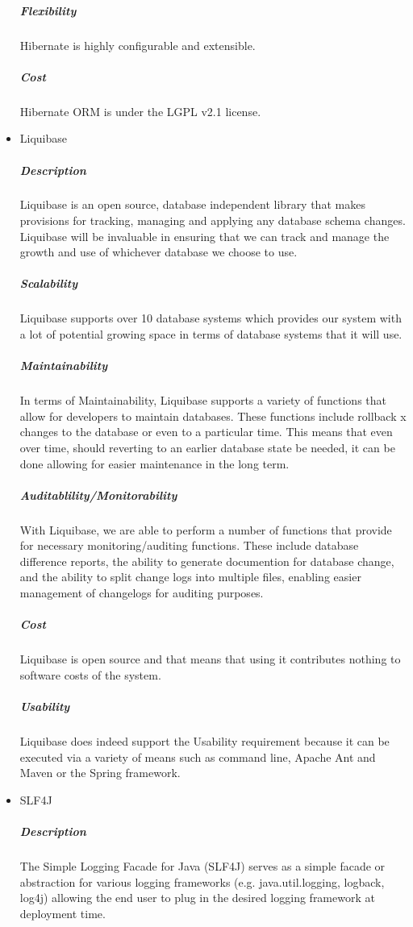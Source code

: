 \documentclass[a4paper,10pt]{article}
\begin{document}
\begin{itemize}
			\subparagraph{Flexibility}
				Hibernate is highly configurable and extensible.			
			\subparagraph{Cost}
				Hibernate ORM is under the LGPL v2.1 license.
		\item Liquibase
			\subparagraph{Description}
			Liquibase is an open source, database independent library that makes provisions for tracking, managing and applying any database schema changes. Liquibase will be invaluable in ensuring that we can track and manage the growth and use of whichever database we choose to use.
			\subparagraph{Scalability}
			Liquibase supports over 10 database systems which provides our system with a lot of potential growing space in terms of database systems that it will use. 
			\subparagraph{Maintainability}
			In terms of Maintainability, Liquibase supports a variety of functions that allow for developers to maintain databases. These functions include rollback x changes to the database or even to a particular time. This means that even over time, should reverting to an earlier database state be needed, it can be done allowing for easier maintenance in the long term.
			\subparagraph{Auditablility/Monitorability}
			With Liquibase, we are able to perform a number of functions that provide for necessary monitoring/auditing functions. These include database difference reports, the ability to generate documention for database change, and the ability to split change logs into multiple files, enabling easier management of changelogs for auditing purposes.
			\subparagraph{Cost}
			Liquibase is open source and that means that using it contributes nothing to software costs of the system. 
			\subparagraph{Usability}
			Liquibase does indeed support the Usability requirement because it can be executed via a variety of means such as command line, Apache Ant and Maven or the Spring framework.

		\item SLF4J
			\subparagraph{Description}
				The Simple Logging Facade for Java (SLF4J) serves as a simple facade or abstraction for various logging frameworks (e.g. java.util.logging, logback, log4j) allowing the end user to plug in the desired logging framework at deployment time. 
			

\end{itemize}
\end{document}
